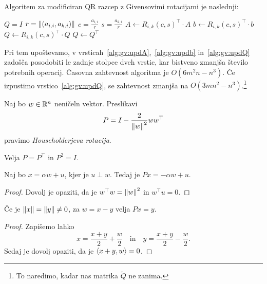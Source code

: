 \begin{opomba}
Algoritem za modificiran QR razcep z Givensovimi rotacijami je
naslednji:

\begin{algorithmic}[1]
\State $Q = I$
    \State $r = \left\lVert (a_{i,i}, a_{k,i})\right\rVert$
    \State $c = \frac{a_{i,i}}{r}$
    \State $s = \frac{a_{k,i}}{r}$
    \State $A \gets R_{i,k}(c,s)^\top \cdot A$
    \label{alg:gv:updA}
    \State $b \gets R_{i,k}(c,s)^\top \cdot b$
    \label{alg:gv:updb}
    \State $Q \gets R_{i,k}(c,s)^\top \cdot Q$
    \label{alg:gv:updQ}
  \EndFor
\EndFor
\State $Q \gets Q^\top$
\end{algorithmic}
Pri tem upoštevamo, v
vrsticah~\ref{alg:gv:updA},~\ref{alg:gv:updb} in~\ref{alg:gv:updQ}
zadošča posodobiti le zadnje stolpce dveh vrstic, kar bistveno
zmanjša število potrebnih operacij. Časovna zahtevnost algoritma je
$O(6m^2n - n^3)$. Če izpustimo vrstico~\ref{alg:gv:updQ}, se
zahtevnost zmanjša na $O(3mn^2 - n^3)$.\footnote{To naredimo, kadar
nas matrika $\widetilde{Q}$ ne zanima.}
\end{opomba}

\begin{definicija}
Naj bo $w \in \mathbb{R}^n$ neničeln vektor. Preslikavi
\[
P = I - \frac{2}{\left\lVert w\right\rVert^2} w w^\top
\]
pravimo
\emph{Householderjeva rotacija}.
\end{definicija}

\begin{trditev}
Velja $P = P^\top$ in $P^2 = I$.
\end{trditev}

\obvs

\begin{trditev}
Naj bo $x = \alpha w + u$, kjer je $u \perp w$. Tedaj je
$Px = - \alpha w + u$.
\end{trditev}

\begin{proof}
Dovolj je opaziti, da je $w^\top w = \left\lVert w\right\rVert^2$ in $w^\top u = 0$.
\end{proof}

\begin{posledica}
Če je $\left\lVert x\right\rVert = \left\lVert y\right\rVert \ne 0$, za $w = x-y$ velja $Px = y$.
\end{posledica}

\begin{proof}
Zapišemo lahko
\[
x = \frac{x+y}{2} + \frac{w}{2}
\quad \text{in} \quad
y = \frac{x+y}{2} - \frac{w}{2}.
\]
Sedaj je dovolj opaziti, da je $\left\langle x+y,w\right\rangle = 0$.
\end{proof}

